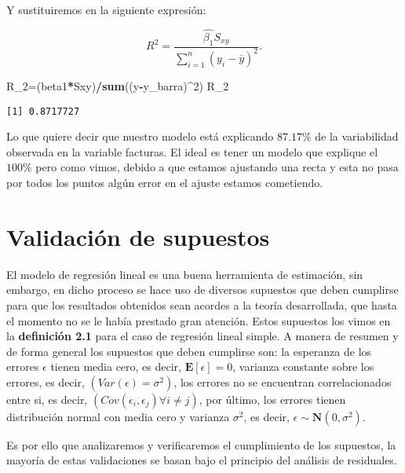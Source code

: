 \documentclass[
  a4paper,
  oneside,
  openany]{book}
\newenvironment{Shaded}{\begin{snugshade}}{\end{snugshade}}
\newcommand{\DecValTok}[1]{\textcolor[rgb]{0.00,0.00,0.81}{#1}}
\newcommand{\FunctionTok}[1]{\textcolor[rgb]{0.13,0.29,0.53}{\textbf{#1}}}
\newcommand{\NormalTok}[1]{#1}
\newcommand{\OtherTok}[1]{\textcolor[rgb]{0.56,0.35,0.01}{#1}}
\newcommand{\SpecialCharTok}[1]{\textcolor[rgb]{0.81,0.36,0.00}{\textbf{#1}}}
\begin{document}
Y sustituiremos en la siguiente expresión:

\[R^2=\frac{\hat{\beta_{1}}S_{xy}}{\sum_{i=1}^{n}(y_{i}-\overline{y})^2}.\]

\begin{Shaded}
\begin{Highlighting}[]
\NormalTok{R\_2}\OtherTok{=}\NormalTok{(beta1}\SpecialCharTok{*}\NormalTok{Sxy)}\SpecialCharTok{/}\FunctionTok{sum}\NormalTok{((y}\SpecialCharTok{{-}}\NormalTok{y\_barra)}\SpecialCharTok{\^{}}\DecValTok{2}\NormalTok{)}
\NormalTok{R\_2}
\end{Highlighting}
\end{Shaded}

\begin{verbatim}
[1] 0.8717727
\end{verbatim}

Lo que quiere decir que nuestro modelo está explicando \(87.17\%\) de la variabilidad observada en la variable facturas. El ideal es tener un modelo que explique el \(100\%\) pero como vimos, debido a que estamos ajustando una recta y esta no pasa por todos los puntos algún error en el ajuste estamos cometiendo.

\hypertarget{validaciuxf3n-de-supuestos}{%
\chapter{Validación de supuestos}\label{validaciuxf3n-de-supuestos}}

El modelo de regresión lineal es una buena herramienta de estimación, sin embargo, en dicho proceso se hace uso de diversos supuestos que deben cumplirse para que los resultados obtenidos sean acordes a la teoría desarrollada, que hasta el momento no se le había prestado gran atención. Estos supuestos los vimos en la \textbf{definición 2.1} para el caso de regresión lineal simple.
A manera de resumen y de forma general los supuestos que deben cumplirse son: la esperanza de los errores \(\epsilon\) tienen media cero, es decir, \(\mathbf{E}[\epsilon]=0\), varianza constante sobre los errores, es decir, \((Var(\epsilon)=\sigma^2)\), los errores no se encuentran correlacionados entre si, es decir, \((Cov(\epsilon_{i},\epsilon_{j})\forall i\neq j)\), por último, los errores tienen distribución normal con media cero y varianza \(\sigma^2\), es decir, \(\epsilon \sim \mathbf{N}(0,\sigma^2).\)

Es por ello que analizaremos y verificaremos el cumplimiento de los supuestos, la mayoría de estas validaciones se basan bajo el principio del análisis de residuales.
\end{document}
